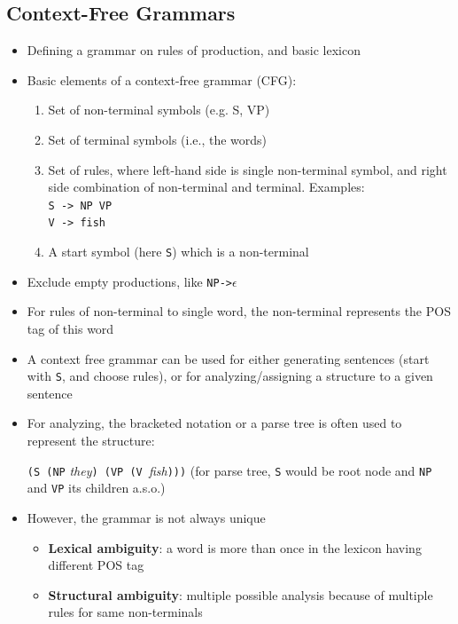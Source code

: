 \subsection{Context-Free Grammars}
\begin{itemize}
	\item Defining a grammar on rules of production, and basic lexicon
	\item Basic elements of a context-free grammar (CFG):
	\begin{enumerate}
		\item Set of non-terminal symbols (e.g. S, VP)
		\item Set of terminal symbols (i.e., the words)
		\item Set of rules, where left-hand side is single non-terminal symbol, and right side combination of non-terminal and terminal. Examples:\\
		\texttt{S -> NP VP}\\
		\texttt{V -> fish}
		\item A start symbol (here \texttt{S}) which is a non-terminal
	\end{enumerate}
	\item Exclude empty productions, like \texttt{NP->$\epsilon$}
	\item For rules of non-terminal to single word, the non-terminal represents the POS tag of this word
	\item A context free grammar can be used for either generating sentences (start with \texttt{S}, and choose rules), or for analyzing/assigning a structure to a given sentence
	\item For analyzing, the bracketed notation or a parse tree is often used to represent the structure:
	
	\texttt{(S (NP} \textit{they}\texttt{) (VP (V }\textit{fish}\texttt{)))}  (for parse tree, \texttt{S} would be root node and \texttt{NP} and \texttt{VP} its children a.s.o.)
	\item However, the grammar is not always unique 
	\begin{itemize}
		\item \textbf{Lexical ambiguity}: a word is more than once in the lexicon having different POS tag
		\item \textbf{Structural ambiguity}: multiple possible analysis because of multiple rules for same non-terminals
	\end{itemize}
\end{itemize}
